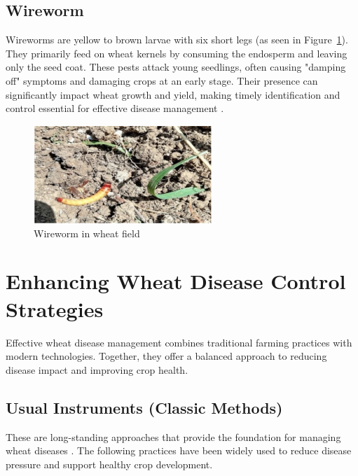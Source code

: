 \subsection{Wireworm}
Wireworms are yellow to brown larvae with six short legs (as seen in Figure~\ref{fig:Figure19}). They primarily feed on wheat kernels by consuming the endosperm and leaving only the seed coat. These pests attack young seedlings, often causing "damping off" symptoms and damaging crops at an early stage. Their presence can significantly impact wheat growth and yield, making timely identification and control essential for effective disease management \parencite{farook2019insect}.


\begin{figure}[H]
    \centering
    \includegraphics[width=0.6\textwidth]{chapters/chapter2/images/Figure19.png}
    \caption{Wireworm in wheat field \protect\parencite{farook2019insect}}
    \label{fig:Figure19}
\end{figure}


\section{Enhancing Wheat Disease Control Strategies}

Effective wheat disease management combines traditional farming practices with modern technologies. Together, they offer a balanced approach to reducing disease impact and improving crop health.

\subsection{Usual Instruments (Classic Methods)}
These are long-standing approaches that provide the foundation for managing wheat diseases \parencite{mehta2014wheat}. The following practices have been widely used to reduce disease pressure and support healthy crop development.

